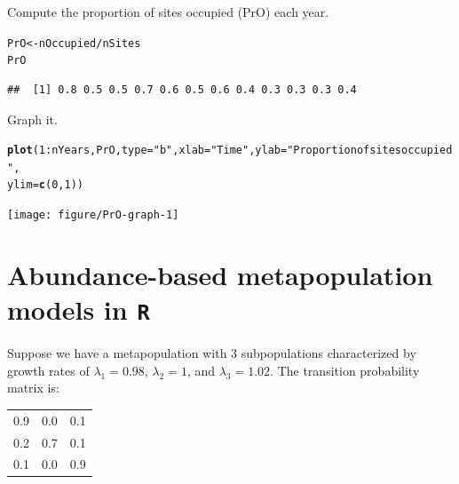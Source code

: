 \documentclass[12pt]{article}\usepackage[]{graphicx}\usepackage[]{color}
\makeatletter
\newcommand{\hlnum}[1]{\textcolor[rgb]{0.686,0.059,0.569}{#1}}%
\newcommand{\hlstr}[1]{\textcolor[rgb]{0.192,0.494,0.8}{#1}}%
\newcommand{\hlopt}[1]{\textcolor[rgb]{0,0,0}{#1}}%
\newcommand{\hlstd}[1]{\textcolor[rgb]{0.345,0.345,0.345}{#1}}%
\newcommand{\hlkwb}[1]{\textcolor[rgb]{0.69,0.353,0.396}{#1}}%
\newcommand{\hlkwc}[1]{\textcolor[rgb]{0.333,0.667,0.333}{#1}}%
\newcommand{\hlkwd}[1]{\textcolor[rgb]{0.737,0.353,0.396}{\textbf{#1}}}%
\newenvironment{kframe}{%
 \def\at@end@of@kframe{}%
 \ifinner\ifhmode%
  \def\at@end@of@kframe{\end{minipage}}%
  \begin{minipage}{\columnwidth}%
 \fi\fi%
 \def\FrameCommand##1{\hskip\@totalleftmargin \hskip-\fboxsep
 \colorbox{shadecolor}{##1}\hskip-\fboxsep
     \hskip-\linewidth \hskip-\@totalleftmargin \hskip\columnwidth}%
 \MakeFramed {\advance\hsize-\width
   \@totalleftmargin\z@ \linewidth\hsize
   \@setminipage}}%
 {\par\unskip\endMakeFramed%
 \at@end@of@kframe}
\newenvironment{knitrout}{}{} %
\makeatother
\begin{document}
\clearpage

Compute the proportion of sites occupied (PrO) each year.
\begin{knitrout}
\color{fgcolor}\begin{kframe}
\begin{alltt}
\hlstd{PrO} \hlkwb{<-} \hlstd{nOccupied} \hlopt{/} \hlstd{nSites}
\hlstd{PrO}
\end{alltt}
\begin{verbatim}
##  [1] 0.8 0.5 0.5 0.7 0.6 0.5 0.6 0.4 0.3 0.3 0.3 0.4
\end{verbatim}
\end{kframe}
\end{knitrout}

Graph it.
\begin{knitrout}
\color{fgcolor}\begin{kframe}
\begin{alltt}
\hlkwd{plot}\hlstd{(}\hlnum{1}\hlopt{:}\hlstd{nYears, PrO,} \hlkwc{type}\hlstd{=}\hlstr{"b"}\hlstd{,} \hlkwc{xlab}\hlstd{=}\hlstr{"Time"}\hlstd{,} \hlkwc{ylab}\hlstd{=}\hlstr{"Proportion of sites occupied"}\hlstd{,}
     \hlkwc{ylim}\hlstd{=}\hlkwd{c}\hlstd{(}\hlnum{0}\hlstd{,} \hlnum{1}\hlstd{))}
\end{alltt}
\end{kframe}
\texttt{[image: figure/PrO-graph-1]} 
\end{knitrout}


\clearpage

\section*{Abundance-based metapopulation models in \texttt{R}}

Suppose we have a metapopulation with 3 subpopulations characterized
by growth rates of $\lambda_1=0.98$, $\lambda_2=1$, and
$\lambda_3=1.02$. The transition probability matrix is:

\begin{table}[h!]
  \centering
  \begin{tabular}{ccc}
    \hline
    0.9 & 0.0 & 0.1 \\
    0.2 & 0.7 & 0.1 \\
    0.1 & 0.0 & 0.9 \\
    \hline
  \end{tabular}
\end{table}
\end{document}
